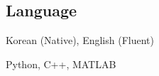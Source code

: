 \documentclass[margin]{res}
\begin{document}
\begin{resume}
		
		\section{Language}
		\par Korean (Native), English (Fluent)
		\par Python, C++, MATLAB
				
	\end{resume}
\end{document}
